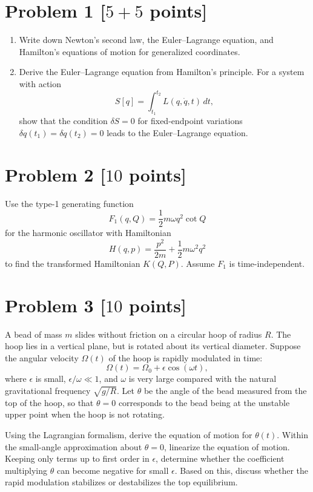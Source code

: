 \documentclass[11pt, a4paper]{article} %
\begin{document}
\section*{Problem 1 [$5 + 5$ points]}
\begin{enumerate}
  \item[(1)] Write down Newton's second law, the Euler--Lagrange equation, and Hamilton's equations of motion for generalized coordinates.

  \item[(2)] Derive the Euler--Lagrange equation from Hamilton's principle. For a system with action
  \[
  S[q]=\int_{t_1}^{t_2} L(q,\dot{q},t)\,dt,
  \]
  show that the condition \(\delta S=0\) for fixed-endpoint variations \(\delta q(t_1)=\delta q(t_2)=0\) leads to the Euler--Lagrange equation.
\end{enumerate}

\newpage

\section*{Problem 2 [$10$ points]}
Use the type-1 generating function
\[
F_1(q,Q)=\frac{1}{2}m\omega q^2\cot Q
\]
for the harmonic oscillator with Hamiltonian
\[
H(q,p)=\frac{p^2}{2m}+\frac{1}{2}m\omega^2q^2
\]
to find the transformed Hamiltonian \(K(Q,P)\). Assume \(F_1\) is time-independent.

\newpage

\section*{Problem 3 [$10$ points]}
A bead of mass \(m\) slides without friction on a circular hoop of radius \(R\). The hoop lies in a vertical plane, but is rotated about its vertical diameter. Suppose the angular velocity \(\Omega(t)\) of the hoop is rapidly modulated in time:
\[
\Omega(t)=\Omega_0+\epsilon \cos(\omega t),
\]
where \(\epsilon\) is small, \(\epsilon/\omega\ll 1\), and \(\omega\) is very large compared with the natural gravitational frequency \(\sqrt{g/R}\). Let \(\theta\) be the angle of the bead measured from the top of the hoop, so that \(\theta=0\) corresponds to the bead being at the unstable upper point when the hoop is not rotating.

Using the Lagrangian formalism, derive the equation of motion for \(\theta(t)\). Within the small-angle approximation about \(\theta=0\), linearize the equation of motion. Keeping only terms up to first order in \(\epsilon\), determine whether the coefficient multiplying \(\theta\) can become negative for small \(\epsilon\). Based on this, discuss whether the rapid modulation stabilizes or destabilizes the top equilibrium.
\end{document}
